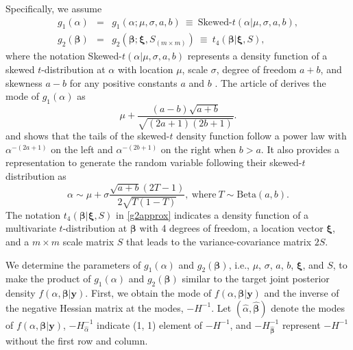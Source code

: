 \documentclass[article]{jss}
\begin{document}
Specifically, we assume
\begin{eqnarray}\label{env}
g_1(\alpha) &=& g_1(\alpha; \mu, \sigma, a, b)~\equiv~\textrm{Skewed-}t(\alpha\vert\mu, \sigma, a, b),\\
g_2(\boldsymbol{\beta}) &=& g_2(\boldsymbol{\beta}; \boldsymbol{\xi}, S_{(m\times m)})~\equiv~t_{4}(\boldsymbol{\beta}\vert \boldsymbol{\xi}, S),\label{g2approx}
\end{eqnarray}
where the notation Skewed-$t(\alpha\vert\mu, \sigma, a, b)$ represents a density function of a skewed $t$-distribution  at $\alpha$ with location $\mu$, scale $\sigma$, degree of freedom $a+b$, and skewness $a-b$ for any positive constants $a$ and $b$ \citep{jones2003skew}. The article of \cite{jones2003skew} derives the mode of $g_1(\alpha)$ as
\begin{equation}\label{mode}
\mu+\frac{(a-b)\sqrt{a+b}}{\sqrt{(2a+1)(2b+1)}}.
\end{equation} 
and shows that the tails of the skewed-$t$ density function  follow a power law with $\alpha^{-(2a+1)}$ on the left and $\alpha^{-(2b+1)}$ on the right when $b>a$. It also provides a representation to generate the random variable following their skewed-$t$ distribution as
\begin{equation}
\alpha\sim \mu+\sigma\frac{\sqrt{a+b}(2T-1)}{2\sqrt{T(1-T)}}, ~\textrm{where}~ T\sim \textrm{Beta}(a, b).
\end{equation}
The notation $t_{4}(\boldsymbol{\beta}\vert\boldsymbol{\xi}, S)$ in  \eqref{g2approx} indicates a density function of a multivariate $t$-distribution at $\boldsymbol{\beta}$ with 4 degrees of freedom, a location vector $\boldsymbol{\xi}$, and a $m\times m$ scale matrix $S$ that leads to the variance-covariance matrix $2S$. 

We determine the parameters of $g_1(\alpha)$ and $g_2(\boldsymbol{\beta})$, i.e., $\mu$, $\sigma$, $a$, $b$, $\boldsymbol{\xi}$, and $S$, to make the product of $g_1(\alpha)$ and $g_2(\boldsymbol{\beta})$ similar to the target joint posterior density $f(\alpha, \boldsymbol{\beta} \vert  \boldsymbol{y})$. First, we obtain the  mode of $f(\alpha, \boldsymbol{\beta} \vert  \boldsymbol{y})$ and the inverse of the  negative Hessian matrix at the modes, $-H^{-1}$. Let $(\hat{\alpha}, \hat{\boldsymbol{\beta}})$ denote the modes of $f(\alpha, \boldsymbol{\beta} \vert  \boldsymbol{y})$, $-H^{-1}_{\hat{\alpha}}$ indicate (1, 1) element of $-H^{-1}$, and $-H^{-1}_{\hat{\boldsymbol{\beta}}}$ represent  $-H^{-1}$ without the first row and  column. 
\end{document}
